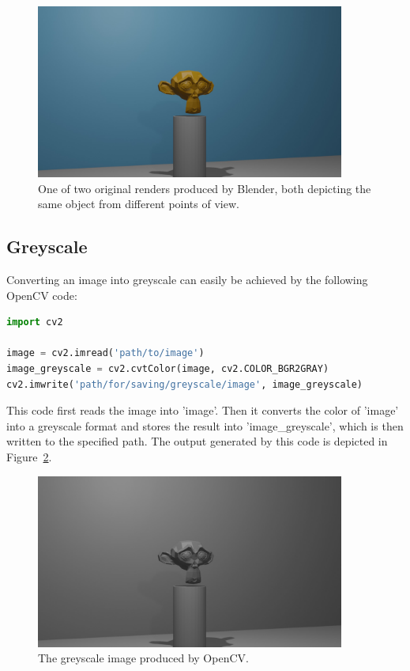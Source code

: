 \begin{figure}[h!]
	\centering
	\includegraphics[width=4in]{img/implementation_opencv_original.png}
	\caption{One of two original renders produced by Blender, both depicting the same object from different points of view.}	%
	\label{pic:implementation_opencv_original}
\end{figure}

\subsection{Greyscale}
Converting an image into greyscale can easily be achieved by the following OpenCV code:

\begin{lstlisting}[language=python]
import cv2

image = cv2.imread('path/to/image')
image_greyscale = cv2.cvtColor(image, cv2.COLOR_BGR2GRAY)
cv2.imwrite('path/for/saving/greyscale/image', image_greyscale)
\end{lstlisting}

This code first reads the image into 'image'. Then it converts the color of 'image' into a greyscale format and stores the result into 'image\_greyscale', which is then written to the specified path. The output generated by this code is depicted in Figure~\ref{pic:implementation_opencv_greyscale}.

\begin{figure}[h!]
	\centering
	\includegraphics[width=4in]{img/implementation_opencv_greyscale.png}
	\caption{The greyscale image produced by OpenCV.}
	\label{pic:implementation_opencv_greyscale}
\end{figure}

